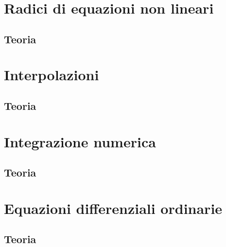 \documentclass[letterpaper, 12pt]{article}
\begin{document}
\section{Radici di equazioni non lineari}
\subsection{Teoria}

\section{Interpolazioni}
\subsection{Teoria}

\section{Integrazione numerica}
\subsection{Teoria}

\section{Equazioni differenziali ordinarie}
\subsection{Teoria}
\end{document}
